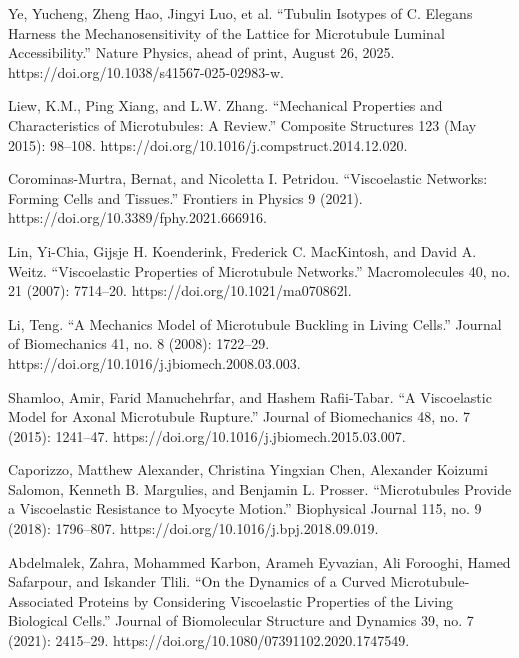 \begin{thebibliography}{00}
Ye, Yucheng, Zheng Hao, Jingyi Luo, et al. “Tubulin Isotypes of C. Elegans Harness the Mechanosensitivity of the Lattice for Microtubule Luminal Accessibility.” Nature Physics, ahead of print, August 26, 2025. https://doi.org/10.1038/s41567-025-02983-w.

Liew, K.M., Ping Xiang, and L.W. Zhang. “Mechanical Properties and Characteristics of Microtubules: A Review.” Composite Structures 123 (May 2015): 98–108. https://doi.org/10.1016/j.compstruct.2014.12.020. %

Corominas-Murtra, Bernat, and Nicoletta I. Petridou. “Viscoelastic Networks: Forming Cells and Tissues.” Frontiers in Physics 9 (2021). https://doi.org/10.3389/fphy.2021.666916. %

Lin, Yi-Chia, Gijsje H. Koenderink, Frederick C. MacKintosh, and David A. Weitz. “Viscoelastic Properties of Microtubule Networks.” Macromolecules 40, no. 21 (2007): 7714–20. https://doi.org/10.1021/ma070862l. %

Li, Teng. “A Mechanics Model of Microtubule Buckling in Living Cells.” Journal of Biomechanics 41, no. 8 (2008): 1722–29. https://doi.org/10.1016/j.jbiomech.2008.03.003.

Shamloo, Amir, Farid Manuchehrfar, and Hashem Rafii-Tabar. “A Viscoelastic Model for Axonal Microtubule Rupture.” Journal of Biomechanics 48, no. 7 (2015): 1241–47. https://doi.org/10.1016/j.jbiomech.2015.03.007.

Caporizzo, Matthew Alexander, Christina Yingxian Chen, Alexander Koizumi Salomon, Kenneth B. Margulies, and Benjamin L. Prosser. “Microtubules Provide a Viscoelastic Resistance to Myocyte Motion.” Biophysical Journal 115, no. 9 (2018): 1796–807. https://doi.org/10.1016/j.bpj.2018.09.019.

Abdelmalek, Zahra, Mohammed Karbon, Arameh Eyvazian, Ali Forooghi, Hamed Safarpour, and Iskander Tlili. “On the Dynamics of a Curved Microtubule-Associated Proteins by Considering Viscoelastic Properties of the Living Biological Cells.” Journal of Biomolecular Structure and Dynamics 39, no. 7 (2021): 2415–29. https://doi.org/10.1080/07391102.2020.1747549.


 
% 
\end{thebibliography}

